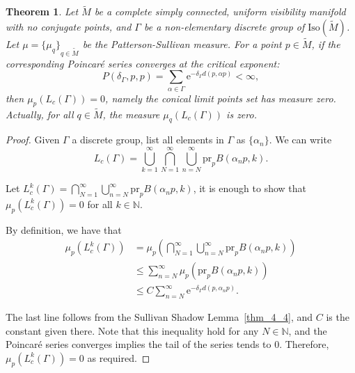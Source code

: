 \documentclass[reqno,11pt]{article}
\newtheorem{theorem}{Theorem}[section]
\theoremstyle{definition}
\theoremstyle{remark}
\numberwithin{equation}{section}
\begin{document}
\begin{theorem}\label{thm_5_5}
	Let $\widetilde{M}$ be a complete simply connected, uniform visibility manifold with no conjugate points, and $\Gamma$ be a non-elementary discrete group of $\text{Iso}(\widetilde{M})$. Let $\mu={\{\mu_q\}}_{q\in\widetilde{M}}$ be the Patterson-Sullivan measure. For a point $p\in\widetilde{M}$, if the corresponding Poincar\'e series converges at the critical exponent:
	\begin{displaymath}
		P(\delta_\Gamma,p,p)=\sum_{\alpha\in\Gamma}\mathrm{e}^{-\delta_\Gamma d(p,\alpha p)}<\infty,
	\end{displaymath}
	then $\mu_p(L_c(\Gamma))=0$, namely the conical limit points set has measure zero. Actually, for all $q\in\widetilde{M}$, the measure $\mu_q(L_c(\Gamma))$ is zero.
\end{theorem}

\begin{proof}
	Given $\Gamma$ a discrete group, list all elements in $\Gamma$ as $\{\alpha_n\}$. We can write
	\begin{displaymath}
		L_c(\Gamma)=\bigcup_{k=1}^\infty\bigcap_{N=1}^{\infty}\bigcup_{n=N}^\infty \text{pr}_p B(\alpha_n p,k).
	\end{displaymath}

	Let $L^k_c(\Gamma)=\bigcap_{N=1}^{\infty}\bigcup_{n=N}^\infty \text{pr}_p B(\alpha_n p,k)$, it is enough to show that $\mu_p(L^k_c(\Gamma))=0$ for all $k\in\mathbb{N}$.

	By definition, we have that
	\begin{equation}
		\begin{aligned}
			\mu_p(L^k_c(\Gamma)) & =\mu_p(\bigcap_{N=1}^{\infty}\bigcup_{n=N}^\infty \text{pr}_p B(\alpha_n p,k)) \\
			                     & \leq\sum_{n=N}^\infty\mu_p(\text{pr}_p B(\alpha_n p,k))                        \\
			                     & \leq C\sum_{n=N}^\infty\mathrm{e}^{-\delta_\Gamma d(p,\alpha_n p)}.
		\end{aligned}
	\end{equation}

	The last line follows from the Sullivan Shadow Lemma~\ref{thm_4_4}, and $C$ is the constant given there. Note that this inequality hold for any $N\in\mathbb{N}$, and the Poincar\'e series converges implies the tail of the series tends to $0$. Therefore, $\mu_p(L_c^k(\Gamma))=0$ as required.
\end{proof}
\end{document}
